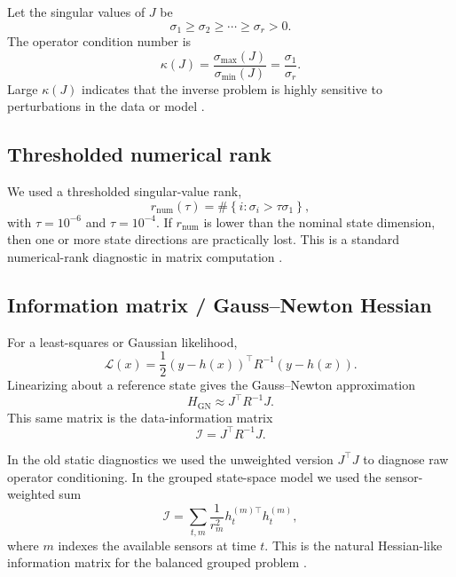 \documentclass[11pt]{article}
\begin{document}
Let the singular values of $J$ be
\begin{equation}
\sigma_1 \ge \sigma_2 \ge \cdots \ge \sigma_r > 0.
\end{equation}
The operator condition number is
\begin{equation}
\kappa(J)
=
\frac{\sigma_{\max}(J)}{\sigma_{\min}(J)}
=
\frac{\sigma_1}{\sigma_r}.
\end{equation}
Large $\kappa(J)$ indicates that the inverse problem is highly sensitive to perturbations in the data or model \cite{higham2002accuracy,golub2013matrix}.

\subsection{Thresholded numerical rank}

We used a thresholded singular-value rank,
\begin{equation}
r_{\mathrm{num}}(\tau)
=
\#\left\{i : \sigma_i > \tau \sigma_1\right\},
\end{equation}
with $\tau = 10^{-6}$ and $\tau = 10^{-4}$. If $r_{\mathrm{num}}$ is lower than the nominal state dimension, then one or more state directions are practically lost. This is a standard numerical-rank diagnostic in matrix computation \cite{golub2013matrix}.

\subsection{Information matrix / Gauss--Newton Hessian}

For a least-squares or Gaussian likelihood,
\begin{equation}
\mathcal{L}(x)
=
\frac{1}{2}(y-h(x))^\top R^{-1}(y-h(x)).
\end{equation}
Linearizing about a reference state gives the Gauss--Newton approximation
\begin{equation}
H_{\mathrm{GN}}
\approx
J^\top R^{-1}J.
\end{equation}
This same matrix is the data-information matrix
\begin{equation}
\mathcal{I}
=
J^\top R^{-1}J.
\end{equation}

In the old static diagnostics we used the unweighted version $J^\top J$ to diagnose raw operator conditioning. In the grouped state-space model we used the sensor-weighted sum
\begin{equation}
\mathcal{I}
=
\sum_{t,m}
\frac{1}{r_m^2}
h_t^{(m)\top}h_t^{(m)},
\end{equation}
where $m$ indexes the available sensors at time $t$. This is the natural Hessian-like information matrix for the balanced grouped problem \cite{stuart2010bayesianinverse}.
\end{document}
